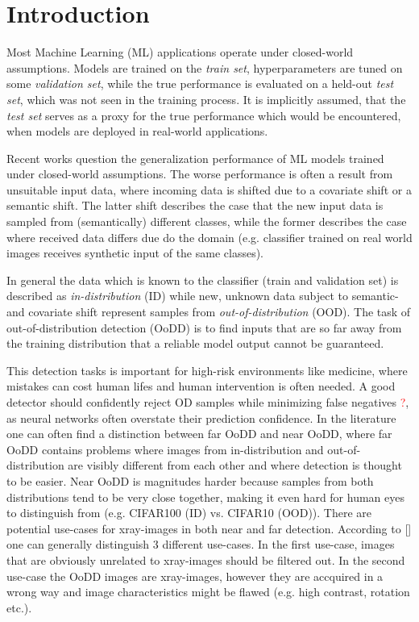 \section{Introduction}
\raggedbottom
Most Machine Learning (ML) applications operate under closed-world assumptions.
Models are trained on the \textit{train set}, hyperparameters are tuned on some \textit{validation set}, while the true performance is evaluated on a held-out \textit{test set}, which was not seen in the training process.
It is implicitly assumed, that the \textit{test set} serves as a proxy for the true performance which would be encountered, when models are deployed in real-world applications.
\par
Recent works question the generalization performance of ML models trained under closed-world assumptions.
The worse performance is often a result from unsuitable input data, where incoming data is shifted due to a covariate shift or a semantic shift.
The latter shift describes the case that the new input data is sampled from (semantically) different classes, while the former describes the case where received data differs due do the domain (e.g. classifier trained on real world images receives synthetic input of the same classes).
\par
In general the data which is known to the classifier (train and validation set) is described as \textit{in-distribution} (ID) while new, unknown data subject to semantic- and covariate shift represent samples from \textit{out-of-distribution} (OOD).
The task of out-of-distribution detection (OoDD) is to find inputs that are so far away from the training distribution that a reliable model output cannot be guaranteed.
\par
This detection tasks is important for high-risk environments like medicine, where mistakes can cost human lifes and human intervention is often needed.
A good detector should confidently reject OD samples while minimizing false negatives \textcolor{red}{?}, as neural networks often overstate their prediction confidence.
In the literature one can often find a distinction between far OoDD and near OoDD, where far OoDD contains problems where images from in-distribution and out-of-distribution are visibly different from each other and where detection is thought to be easier.
Near OoDD is magnitudes harder because samples from both distributions tend to be very close together, making it even hard for human eyes to distinguish from (e.g. CIFAR100 (ID) vs. CIFAR10 (OOD)).
There are potential use-cases for xray-images in both near and far detection.
According to [] one can generally distinguish 3 different use-cases.
In the first use-case, images that are obviously unrelated to xray-images should be filtered out.
In the second use-case the OoDD images are xray-images, however they are accquired in a wrong way and image characteristics might be flawed (e.g. high contrast, rotation etc.).

